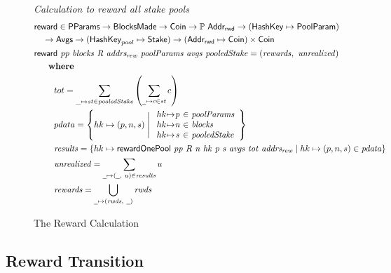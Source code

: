 \begin{figure}[htb]
  \emph{Calculation to reward all stake pools}
  \begin{align*}
      & \fun{reward} \in \PParams \to \BlocksMade \to \Coin\to \powerset{\AddrRWD}
      \to (\HashKey \mapsto \PoolParam) \\
      & ~~~\to \Avgs \to (\HashKey_{pool} \mapsto \Stake) \to (\AddrRWD \mapsto \Coin)\times\Coin\\
      & \reward{pp}{blocks}{R}{addrs_{rew}}{poolParams}{avgs}{pooledStake}
          = (\var{rewards},~\var{unrealized})\\
      & ~~~\where \\
      & ~~~~~~~tot = \sum_{\_\mapsto st\in \var{pooledStake}}
                       \left(
                       \sum_{\wcard\mapsto c\in\var{st}}c
                       \right) \\
      & ~~~~~~~pdata = \left\{
        hk\mapsto (p, n, s)  \mathrel{\Bigg|}
        \begin{array}{r@{\mapsto}c@{~\in~}l}
          hk & \var{p} & \var{poolParams} \\
          hk & \var{n} & \var{blocks} \\
          hk & \var{s} & \var{pooledStake} \\
        \end{array}
      \right\} \\
      & ~~~~~~~\var{results} = \left\{
        hk \mapsto \rewardOnePool{pp}{R}{n}{hk}{p}{s}{avgs}{tot}{addrs_{rew}}
                 \mid
                 hk\mapsto(p, n, s)\in\var{pdata} \right\} \\
      & ~~~~~~~\var{unrealized} = \sum_{\wcard\mapsto (\wcard,~u)\in\var{results}}u \\
      & ~~~~~~~\var{rewards} = \bigcup_{\wcard\mapsto(\var{rwds},~\wcard)}\var{rwds}
  \end{align*}
  \caption{The Reward Calculation}
  \label{fig:functions:reward-calc}
\end{figure}

\clearpage

\subsection{Reward Transition}
\label{sec:reward-trans}

